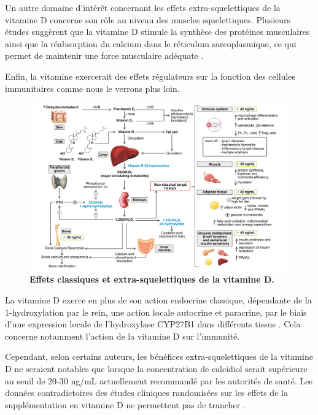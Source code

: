 \documentclass[
  a4paper,
  DIV=11,
  numbers=noendperiod,
  listof=totoc]{scrreprt}
\begin{document}
Un autre domaine d'intérêt concernant les effets extra-squelettiques de
la vitamine D concerne son rôle au niveau des muscles squelettiques.
Plusieurs études suggèrent que la vitamine D stimule la synthèse des
protéines musculaires ainsi que la réabsorption du calcium dans le
réticulum sarcoplasmique, ce qui permet de maintenir une force
musculaire adéquate \autocite{Caprio.2017}.

Enfin, la vitamine exercerait des effets régulateurs sur la fonction des
cellules immunitaires comme nous le verrons plus loin.

\begin{landscape}
\begin{figure}
\includegraphics{figures/extra-skeletal-effect.png} 
\caption[Effets classiques et extra-squelettiques de la vitamine D.]
{\textbf{Effets classiques et extra-squelettiques de la vitamine D.} \textcite{Caprio.2017}}
\label{fig:extra-skeletal}
\end{figure}
\end{landscape}

La vitamine D exerce en plus de son action endocrine classique,
dépendante de la 1-hydroxylation par le rein, une action locale
autocrine et paracrine, par le biais d'une expression locale de
l'hydroxylase \ac{CYP27B1} dans différents tissus
\autocite{Carmeliet.2015,Cannell.2008}. Cela concerne notamment l'action
de la vitamine D sur l'immunité.

Cependant, selon certains auteurs, les bénéfices extra-squelettiques de
la vitamine D ne seraient notables que lorsque la concentration de
calcidiol serait supérieure au seuil de 20-30 ng/mL actuellement
recommandé par les autorités de santé. Les données contradictoires des
études cliniques randomisées sur les effets de la supplémentation en
vitamine D ne permettent pas de trancher
\autocite{Caprio.2017,Lewis.2015,Bouillon.2013,Rejnmark.2017}.
\end{document}
